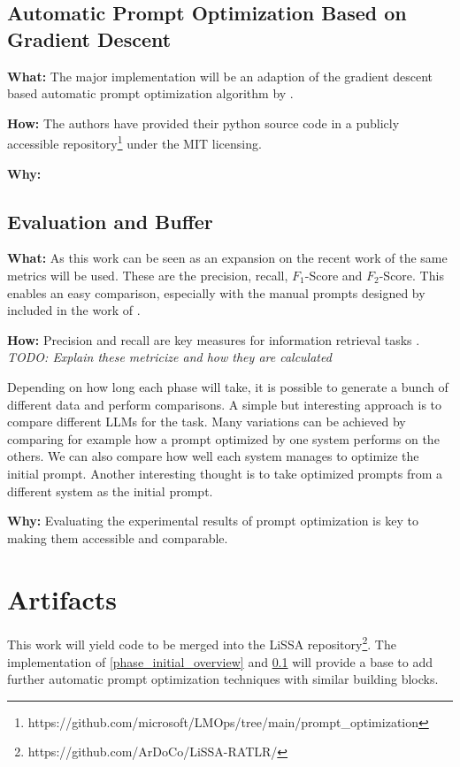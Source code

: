 \subsection{Automatic Prompt Optimization Based on Gradient Descent}
\label{phase_gradient_descent}
\textbf{What:} The major implementation will be an adaption of the gradient descent based automatic prompt optimization algorithm by . 

\textbf{How:} The authors have provided their python source code in a publicly accessible repository\footnote{https://github.com/microsoft/LMOps/tree/main/prompt\_optimization} under the MIT licensing. 


\textbf{Why:} 


\subsection{Evaluation and Buffer}
\label{phase_evaluation}
\textbf{What:} As this work can be seen as an expansion on the recent work of  the same metrics will be used. These are the precision, recall, $F_1$-Score and $F_2$-Score. This enables an easy comparison, especially with the manual prompts designed by  included in the work of \citeauthor{fuchss2025LiSSAGeneric}.

\textbf{How:} Precision and recall are key measures for information retrieval tasks \cite{hayes2006AdvancingCandidate}. \textit{TODO: Explain these metricize and how they are calculated} 

Depending on how long each phase will take, it is possible to generate a bunch of different data and perform comparisons.
A simple but interesting approach is to compare different LLMs for the task. Many variations can be achieved by comparing for example how a prompt optimized by one system performs on the others. We can also compare how well each system manages to optimize the initial prompt. 
Another interesting thought is to take optimized prompts from a different system as the initial prompt. 


\textbf{Why:} Evaluating the experimental results of prompt optimization is key to making them accessible and comparable. 







\section{Artifacts}
This work will yield code to be merged into the LiSSA repository\footnote{https://github.com/ArDoCo/LiSSA-RATLR/}. The implementation of \ref{phase_initial_overview} and \ref{phase_gradient_descent} will provide a base to add further automatic prompt optimization techniques with similar building blocks.

